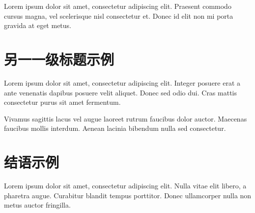 \documentclass[BAhumanities,customization]{main}
\begin{document}
Lorem ipsum dolor sit amet, consectetur adipiscing elit. Praesent commodo cursus magna, vel scelerisque nisl consectetur et. Donec id elit non mi porta gravida at eget metus.

\section{另一一级标题示例}

Lorem ipsum dolor sit amet, consectetur adipiscing elit. Integer posuere erat a ante venenatis dapibus posuere velit aliquet. Donec sed odio dui. Cras mattis consectetur purus sit amet fermentum.

Vivamus sagittis lacus vel augue laoreet rutrum faucibus dolor auctor. Maecenas faucibus mollis interdum. Aenean lacinia bibendum nulla sed consectetur.

\section*{结语示例}

Lorem ipsum dolor sit amet, consectetur adipiscing elit. Nulla vitae elit libero, a pharetra augue. Curabitur blandit tempus porttitor. Donec ullamcorper nulla non metus auctor fringilla.

\clearpage

\end{document}
